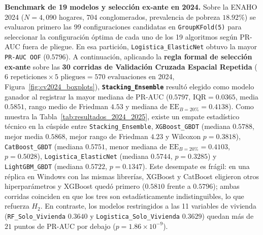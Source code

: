 \textbf{Benchmark de 19 modelos y selección ex-ante en 2024.} Sobre la ENAHO 2024 ($N=4{,}090$ hogares, 704 conglomerados, prevalencia de pobreza $18.92\%$) se evaluaron primero las 99 configuraciones candidatas en \texttt{GroupKFold(5)} para seleccionar la configuración óptima de cada uno de los 19 algoritmos según PR-AUC fuera de pliegue. En esa partición, \texttt{Logistica\_ElasticNet} obtuvo la mayor \texttt{PR-AUC OOF} ($0.5796$). A continuación, aplicando la \textbf{regla formal de selección ex-ante} sobre las \textbf{30 corridas de Validación Cruzada Espacial Repetida} ($6\text{ repeticiones}\times 5\text{ pliegues} = 570\text{ evaluaciones}$ en 2024, Figura~\ref{fig:cv2024_boxplots}), \textbf{\texttt{Stacking\_Ensemble}} resultó elegido como modelo ganador al registrar la mayor mediana de PR-AUC ($0.5797$, $\text{IQR}=0.0365$, media $0.5851$, rango medio de Friedman $4.53$ y mediana de $\text{EE}_{B=20\%}=0.4138$). Como muestra la Tabla~\ref{tab:resultados_2024_2025}, existe un empate estadístico técnico en la cúspide entre \texttt{Stacking\_Ensemble}, \texttt{XGBoost\_GBDT} (mediana $0.5788$, mejor media $0.5868$, mejor rango de Friedman $4.23$ y Wilcoxon $p=0.3818$), \texttt{CatBoost\_GBDT} (mediana $0.5751$, menor mediana de $\text{EE}_{B=20\%}=0.4103$, $p=0.5028$), \texttt{Logistica\_ElasticNet} (mediana $0.5744$, $p=0.3285$) y \texttt{LightGBM\_GBDT} (mediana $0.5722$, $p=0.1347$). Este desempate es frágil: en una réplica en Windows con las mismas librerías, XGBoost y CatBoost eligieron otros hiperparámetros y XGBoost quedó primero ($0.5810$ frente a $0.5796$); ambas corridas coinciden en que los tres son estadísticamente indistinguibles, lo que refuerza $H_2$. En contraste, los modelos restringidos a las 11 variables de vivienda (\texttt{RF\_Solo\_Vivienda} $0.3640$ y \texttt{Logistica\_Solo\_Vivienda} $0.3629$) quedan más de $21$ puntos de PR-AUC por debajo ($p = 1.86\times 10^{-9}$).

